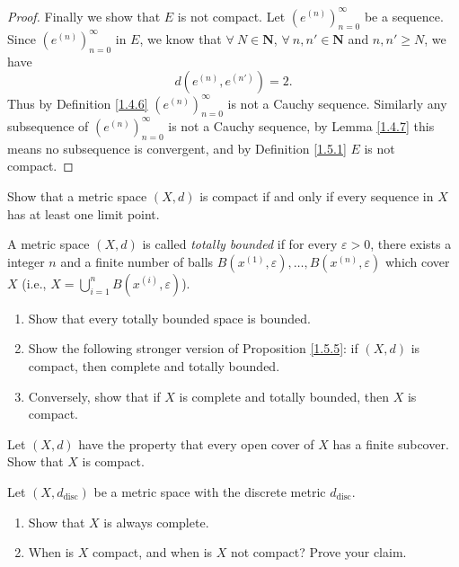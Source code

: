 \begin{proof}
    Finally we show that \(E\) is not compact.
    Let \((e^{(n)})_{n = 0}^\infty\) be a sequence.
    Since \((e^{(n)})_{n = 0}^\infty\) in \(E\), we know that \(\forall\ N \in \mathbf{N}\), \(\forall\ n, n' \in \mathbf{N}\) and \(n, n' \geq N\), we have
    \[
        d(e^{(n)}, e^{(n')}) = 2.
    \]
    Thus by Definition \ref{1.4.6} \((e^{(n)})_{n = 0}^\infty\) is not a Cauchy sequence.
    Similarly any subsequence of \((e^{(n)})_{n = 0}^\infty\) is not a Cauchy sequence, by Lemma \ref{1.4.7} this means no subsequence is convergent, and by Definition \ref{1.5.1} \(E\) is not compact.
\end{proof}

\begin{exercise}\label{ex 1.5.9}
    Show that a metric space \((X, d)\) is compact if and only if every sequence in \(X\) has at least one limit point.
\end{exercise}

\begin{exercise}\label{ex 1.5.10}
    A metric space \((X, d)\) is called \emph{totally bounded} if for every \(\varepsilon > 0\), there exists a integer \(n\) and a finite number of balls \(B(x^{(1)}, \varepsilon), \dots, B(x^{(n)}, \varepsilon)\) which cover \(X\) (i.e., \(X = \bigcup_{i = 1}^n B(x^{(i)}, \varepsilon)\)).
    \begin{enumerate}
        \item Show that every totally bounded space is bounded.
        \item Show the following stronger version of Proposition \ref{1.5.5}:
              if \((X, d)\) is compact, then complete and totally bounded.
        \item Conversely, show that if \(X\) is complete and totally bounded, then \(X\) is compact.
    \end{enumerate}
\end{exercise}

\begin{exercise}\label{ex 1.5.11}
    Let \((X, d)\) have the property that every open cover of \(X\) has a finite subcover.
    Show that \(X\) is compact.
\end{exercise}

\begin{exercise}\label{ex 1.5.12}
    Let \((X, d_{\text{disc}})\) be a metric space with the discrete metric \(d_{\text{disc}}\).
    \begin{enumerate}
        \item Show that \(X\) is always complete.
        \item When is \(X\) compact, and when is \(X\) not compact?
              Prove your claim.
    \end{enumerate}
\end{exercise}

